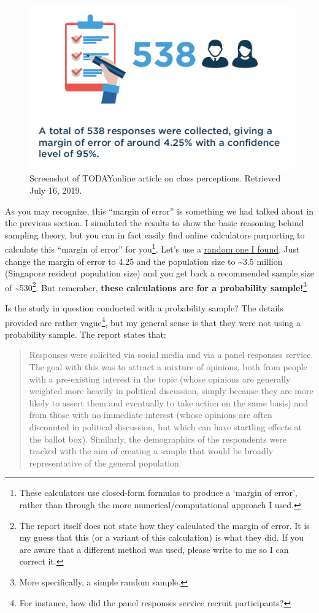 \documentclass[
  openany]{book}
\begin{document}
\begin{figure}

{\centering \includegraphics[width=0.6\linewidth]{images/samples/lkyspp_reportsample} 

}

\caption{Screenshot of TODAYonline article on class perceptions. Retrieved July 16, 2019.}\label{fig:today-reportsample}
\end{figure}

As you may recognize, this ``margin of error'' is something we had talked about in the previous section. I simulated the results to show the basic reasoning behind sampling theory, but you can in fact easily find online calculators purporting to calculate this ``margin of error'' for you\footnote{These calculators use closed-form formulas to produce a `margin of error', rather than through the more numerical/computational approach I used.}. Let's use a \href{http://www.raosoft.com/samplesize.html}{random one I found}. Just change the margin of error to 4.25 and the population size to \textasciitilde3.5 million (Singapore resident population size) and you get back a recommended sample size of \textasciitilde530\footnote{The report itself does not state how they calculated the margin of error. It is my guess that this (or a variant of this calculation) is what they did. If you are aware that a different method was used, please write to me so I can correct it.}. But remember, \textbf{these calculations are for a probability sample!}\footnote{More specifically, a simple random sample.}

Is the study in question conducted with a probability sample? The details provided are rather vague\footnote{For instance, how did the panel responses service recruit participants?}, but my general sense is that they were not using a probability sample. The report states that:

\begin{quote}
Responses were solicited via social media and via a panel responses service. The goal with this was to attract a mixture of opinions, both from people with a pre-existing interest in the topic (whose opinions are generally weighted more heavily in political discussion, simply because they are more likely to assert them and eventually to take action on the same basis) and from those with no immediate interest (whose opinions are often discounted in political discussion, but which can have startling effects at the ballot box). Similarly, the demographics of the respondents were tracked with the aim of creating a sample that would be broadly representative of the general population.
\end{quote}
\end{document}
